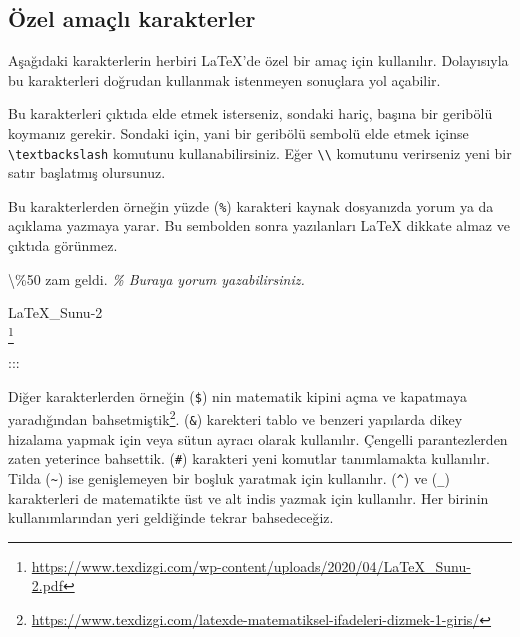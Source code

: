 \documentclass[
  10pt,
]{scrbook}
\newenvironment{Shaded}{\begin{snugshade}}{\end{snugshade}}
\newcommand{\CommentTok}[1]{\textcolor[rgb]{0.56,0.35,0.01}{\textit{#1}}}
\newcommand{\FunctionTok}[1]{\textcolor[rgb]{0.00,0.00,0.00}{#1}}
\newcommand{\NormalTok}[1]{#1}
\renewcommand{\href}[2]{#2\footnote{\url{#1}}}
\begin{document}
\hypertarget{uxf6zel-amauxe7lux131-karakterler}{%
\subsection{Özel amaçlı karakterler}\label{uxf6zel-amauxe7lux131-karakterler}}

Aşağıdaki karakterlerin herbiri LaTeX'de özel bir amaç için kullanılır.
Dolayısıyla bu karakterleri doğrudan kullanmak istenmeyen sonuçlara yol
açabilir.

\begin{Shaded}
\begin{Highlighting}[]
\NormalTok{\#  $  \%   \&   \{   \}   \textasciitilde{}  \^{}  \_ \textbackslash{}}
\end{Highlighting}
\end{Shaded}

Bu karakterleri çıktıda elde etmek isterseniz, sondaki hariç, başına bir
geribölü koymanız gerekir. Sondaki için, yani bir geribölü sembolü elde
etmek içinse \texttt{\textbackslash{}textbackslash} komutunu kullanabilirsiniz. Eğer \texttt{\textbackslash{}\textbackslash{}}
komutunu verirseniz yeni bir satır başlatmış olursunuz.

Bu karakterlerden örneğin yüzde (\texttt{\%}) karakteri kaynak dosyanızda yorum
ya da açıklama yazmaya yarar. Bu sembolden sonra yazılanları LaTeX
dikkate almaz ve çıktıda görünmez.

\begin{Shaded}
\begin{Highlighting}[]
\FunctionTok{\textbackslash{}\%}\NormalTok{50 zam geldi. }
\CommentTok{\% Buraya yorum yazabilirsiniz.}
\end{Highlighting}
\end{Shaded}

\href{https://www.texdizgi.com/wp-content/uploads/2020/04/LaTeX_Sunu-2.pdf}{LaTeX\_Sunu-2\\
}

:::

Diğer karakterlerden örneğin (\texttt{\$}) nin matematik kipini açma ve
kapatmaya yaradığından
\href{https://www.texdizgi.com/latexde-matematiksel-ifadeleri-dizmek-1-giris/}{bahsetmiştik}. (\texttt{\&}) karekteri tablo ve benzeri yapılarda dikey
hizalama yapmak için veya sütun ayracı olarak kullanılır. Çengelli
parantezlerden zaten yeterince bahsettik. (\texttt{\#}) karakteri yeni komutlar
tanımlamakta kullanılır. Tilda (\texttt{\textasciitilde{}}) ise genişlemeyen bir boşluk
yaratmak için kullanılır. (\texttt{\^{}}) ve (\texttt{\_}) karakterleri de matematikte üst
ve alt indis yazmak için kullanılır. Her birinin kullanımlarından yeri
geldiğinde tekrar bahsedeceğiz.

\backmatter

  

\printindex
\end{document}
